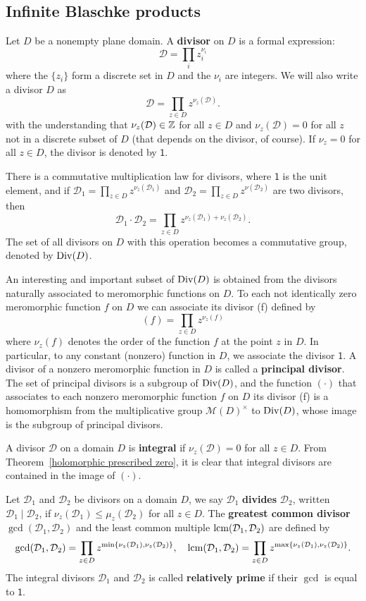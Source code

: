 \subsection{Infinite Blaschke products}
\begin{definition}
Let $D$ be a nonempty plane domain. A \textbf{divisor} on $D$ is a formal expression:
\[\mathcal{D}=\prod_iz_i^{\nu_i}\]
where the $\{z_i\}$ form a discrete set in $D$ and the $\nu_i$ are integers. We will also write a divisor $D$ as
\[\mathcal{D}=\prod_{z\in D}z^{\nu_z(\mathcal{D})}.\]
with the understanding that $\nu_z(\mathcal{D})\in\mathbb{Z}$ for all $z\in D$ and $\nu_z(\mathcal{D})=0$ for all $z$ not in a discrete subset of $D$ (that depends on the divisor, of course). If $\nu_z=0$ for all $z\in D$, the divisor is denoted by $\mathsf{1}$.
\end{definition}
There is a commutative multiplication law for divisors, where $\mathsf{1}$ is the unit element, and if $\mathcal{D}_1=\prod_{z\in D}z^{\nu_z(\mathcal{D}_1)}$ and $\mathcal{D}_2=\prod_{z\in D}z^{\nu(\mathcal{D}_2)}$ are two divisors, then
\[\mathcal{D}_1\cdot \mathcal{D}_2=\prod_{z\in D}z^{\nu_z(\mathcal{D}_1)+\nu_z(\mathcal{D}_2)}.\]
The set of all divisors on $D$ with this operation becomes a commutative group, denoted by $\mathrm{Div}(D)$.\par
An interesting and important subset of $\mathrm{Div}(D)$ is obtained from the divisors naturally associated to meromorphic functions on $D$. To each not identically zero meromorphic function $f$ on $D$ we can associate its divisor (f) defined by
\[(f)=\prod_{z\in D}z^{\nu_z(f)}\]
where $\nu_z(f)$ denotes the order of the function $f$ at the point $z$ in $D$. In particular, to any constant (nonzero) function in $D$, we associate the divisor $\mathsf{1}$. A divisor of a nonzero meromorphic function in $D$ is called a \textbf{principal divisor}. The set of principal divisors is a subgroup of $\mathrm{Div}(D)$, and the function $(\cdot)$ that associates to each nonzero meromorphic function $f$ on $D$ its divisor (f) is a homomorphism from the multiplicative group $\mathcal{M}(D)^{\times}$ to $\mathrm{Div}(D)$, whose image is the subgroup of principal divisors.\par
A divisor $\mathcal{D}$ on a domain $D$ is \textbf{integral} if $\nu_z(\mathcal{D})=0$ for all $z\in D$. From Theorem~\ref{holomorphic prescribed zero}, it is clear that integral divisors are contained in the image of $(\cdot)$.
\begin{definition}
Let $\mathcal{D}_1$ and $\mathcal{D}_2$ be divisors on a domain $D$, we say $\mathcal{D}_1$ \textbf{divides} $\mathcal{D}_2$, written $\mathcal{D}_1\mid\mathcal{D}_2$, if $\nu_z(\mathcal{D}_1)\leq\mu_z(\mathcal{D}_2)$ for all $z\in D$. The \textbf{greatest common divisor} $\gcd(\mathcal{D}_1,\mathcal{D}_2)$ and the least common multiple $\mathrm{lcm}(\mathcal{D}_1,\mathcal{D}_2)$ are defined by
\[\gcd(\mathcal{D}_1,\mathcal{D}_2)=\prod_{z\in D}z^{\min\{\nu_{z}(\mathcal{D}_1),\nu_{z}(\mathcal{D}_2)\}},\quad\mathrm{lcm}(\mathcal{D}_1,\mathcal{D}_2)=\prod_{z\in D}z^{\max\{\nu_{z}(\mathcal{D}_1),\nu_{z}(\mathcal{D}_2)\}}.\]The integral divisors $\mathcal{D}_1$ and $\mathcal{D}_2$ is called \textbf{relatively prime} if their $\gcd$ is equal to $\mathsf{1}$.
\end{definition}
